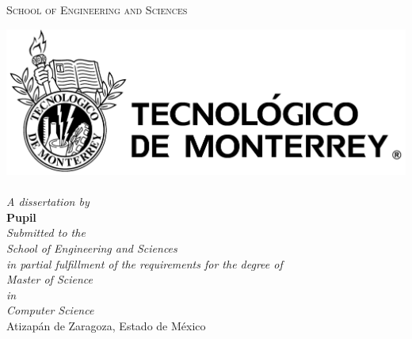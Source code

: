 \documentclass[11pt, a4paper, oneside]{Thesis} %
\title{\ttitle}
\begin{document}
\frontmatter
{}

\fancyhead{}
\rhead{\thepage}
\lhead{}

\pagestyle{fancy}
\newcommand{\HRule}{\rule{\linewidth}{0.5mm}}

\hypersetup{pdfsubject=\subjectname}
\hypersetup{pdfauthor=\authornames}
\hypersetup{pdfkeywords=\keywordnames}
\newenvironment{abstrt}{\rightskip1in\itshape}{}

\begin{titlepage}
    \begin{center}

        \textsc{\Large \univname}\\
        \textsc{\facname}\\
        \textsc{\Large School of Engineering and Sciences}

        \includegraphics[scale=0.3]{./Figures/logoTEC.png}
        \\[1cm]

        \centering{\Large \bfseries \ttitle}\\[0.5cm]
        \textit{A dissertation by\\}
        \Large \textbf{Pupil}\\[1cm]

        \large \textit{Submitted to the \\School of Engineering and Sciences\\
            in partial fulfillment of the requirements for the degree of\\[1cm] Master of Science \\in\\Computer Science}\\[5cm]

        Atizapán de Zaragoza, Estado de México\\
        {\large {}}\\[1.5cm]
        \vfill
    \end{center}

\end{titlepage}
\end{document}
